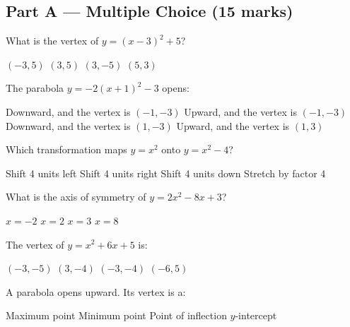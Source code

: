 \documentclass[addpoints]{exam}
\begin{document}
\newpage
\begin{questions}

\section*{Part A --- Multiple Choice (15 marks)}
\vspace{5mm}

\question[1] What is the vertex of $y = (x - 3)^2 + 5$?
\begin{choices}
    \choice $(-3, 5)$
    \correctchoice $(3, 5)$
    \choice $(3, -5)$
    \choice $(5, 3)$
\end{choices}
\vspace{3mm}

\question[1] The parabola $y = -2(x + 1)^2 - 3$ opens:
\begin{choices}
    \correctchoice Downward, and the vertex is $(-1, -3)$
    \choice Upward, and the vertex is $(-1, -3)$
    \choice Downward, and the vertex is $(1, -3)$
    \choice Upward, and the vertex is $(1, 3)$
\end{choices}
\vspace{3mm}

\question[1] Which transformation maps $y = x^2$ onto $y = x^2 - 4$?
\begin{choices}
    \choice Shift 4 units left
    \choice Shift 4 units right
    \correctchoice Shift 4 units down
    \choice Stretch by factor 4
\end{choices}
\vspace{3mm}

\question[1] What is the axis of symmetry of $y = 2x^2 - 8x + 3$?
\begin{choices}
    \choice $x = -2$
    \correctchoice $x = 2$
    \choice $x = 3$
    \choice $x = 8$
\end{choices}
\vspace{3mm}

\question[1] The vertex of $y = x^2 + 6x + 5$ is:
\begin{choices}
    \choice $(-3, -5)$
    \choice $(3, -4)$
    \correctchoice $(-3, -4)$
    \choice $(-6, 5)$
\end{choices}
\vspace{3mm}

\question[1] A parabola opens upward. Its vertex is a:
\begin{choices}
    \choice Maximum point
    \correctchoice Minimum point
    \choice Point of inflection
    \choice $y$-intercept
\end{choices}
\vspace{3mm}


\end{questions}
\end{document}
